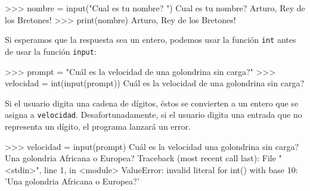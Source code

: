 
\begin{pyconcode}
>>> nombre = input("Cual es tu nombre? ")
Cual es tu nombre? Arturo, Rey de los Bretones!
>>> print(nombre)
Arturo, Rey de los Bretones!
\end{pyconcode}

Si esperamos que la respuesta sea un entero, podemos usar la función
\texttt{int} antes de usar la función \texttt{input}:

\begin{pyconcode}
>>> prompt = "Cuál es la velocidad de una golondrina sin carga?\n"
>>> velocidad = int(input(prompt))
Cuál es la velocidad de una golondrina sin carga?

\end{pyconcode}
Si el usuario digita una cadena de dígitos, éstos se convierten a
un entero que se asigna a \texttt{velocidad}. Desafortunadamente,
si el usuario digita una entrada que no representa un dígito, el programa
lanzará un error.

\pagebreak

\begin{pyconcode}
>>> velocidad = input(prompt)
Cuál es la velocidad una golondrina sin carga?
Una golondria Africana o Europea?
Traceback (most recent call last):
File "<stdin>", line 1, in <module>
ValueError: invalid literal for int() with base 10: 'Una golondria Africana o Europea?'
\end{pyconcode}


